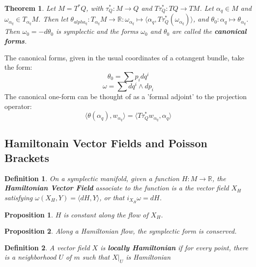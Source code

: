 \documentclass{article}
\newtheorem{thm}{Theorem}
\newtheorem{defn}{Definition}
\newtheorem{prop}{Proposition}
\begin{document}
\begin{thm}

Let $M = T^*Q$, with $\tau^*_Q: M \to Q$ and $T\tau^*_Q: TQ \to TM$. Let $\alpha_q \in M$ and $\omega_{\alpha_q} \in T_{\alpha_q}M$. Then let $ \theta_{alpha_q}: T_{\alpha_q}M \to \mathbb{R}: \omega_{\alpha_q} \mapsto \langle \alpha_q, T \tau^*_Q(\omega_{\alpha_q})\rangle  $, and $ \theta_0: \alpha_q \mapsto \theta_{\alpha_q} $. Then $\omega_0 = - d\theta_0$ is symplectic and the forms $\omega_0$ and $ \theta_0 $ are called the \textbf{canonical forms}.

\end{thm}
\indent The canonical forms, given in the usual coordinates of a cotangent bundle, take the form: 
\[\theta_0 = \sum p_i dq^i\]
\[\omega = \sum dq^i \wedge dp_i\]
\indent The canonical one-form can be thought of as a 'formal adjoint' to the projection operator:
\[\langle \theta(\alpha_q), w_{\alpha_q}\rangle  = \langle T\tau^*_Q w_{\alpha_q}, \alpha_q\rangle \]

\subsection{Hamiltonain Vector Fields and Poisson Brackets}



\begin{defn}

On a symplectic manifold, given a function $H: M \to \mathbb{R}$, the \textbf{Hamiltonian Vector Field} associate to the function is a the vector field $X_H$ satisfying $ \omega(X_H, Y) = \langle dH, Y\rangle $, or that $ i_{X_H}\omega = dH$. 

\end{defn}

\begin{prop}

$H$ is constant along the flow of $X_H$.

\end{prop}

\begin{prop}

Along a Hamiltonian flow, the symplectic form is conserved.

\end{prop}

\begin{defn}

A vector field $X$ is \textbf{locally Hamiltonian} if for every point, there is a neighborhood $U$ of $m$ such that $X\vert_U$ is Hamiltonian

\end{defn}
\end{document}

